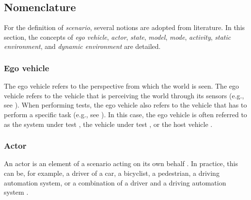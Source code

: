 


\subsection{Nomenclature}
\label{sec:nomenclature}

For the definition of \emph{scenario}, several notions are adopted from literature. In this section, the concepts of \emph{ego vehicle}, \emph{actor}, \emph{state}, \emph{model}, \emph{mode}, \emph{activity}, \emph{static environment}, and \emph{dynamic environment} are detailed. 

\subsubsection{Ego vehicle}
\label{sec:ego vehicle}
The ego vehicle refers to the perspective from which the world is seen. The ego vehicle refers to the vehicle that is perceiving the world through its sensors (e.g., see \cite{Bonnin2014}). When performing tests, the ego vehicle also refers to the vehicle that has to perform a specific task (e.g., see \cite{althoff2017CommonRoad}). In this case, the ego vehicle is often referred to as the system under test \cite{stellet2015taxonomy}, the vehicle under test \cite{gietelink2006development}, or the host vehicle \cite{gietelink2006development}.

\subsubsection{Actor}
\label{sec:actor}
An actor is an element of a scenario acting on its own behalf \cite{ulbrich2015}. In practice, this can be, for example, a driver of a car, a bicyclist, a pedestrian, a driving automation system, or a combination of a driver and a driving automation system \cite{geyer2014}.

